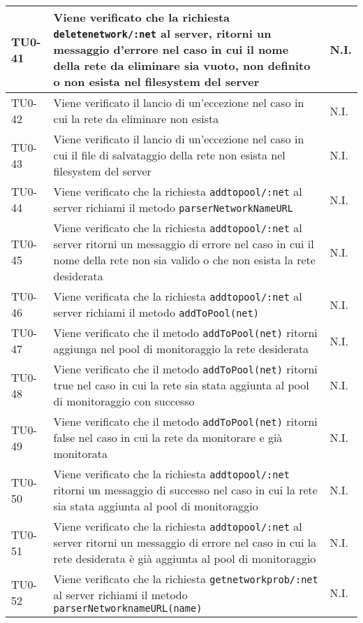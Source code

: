 \begin{longtable}{|C{.15\textwidth}|m{.66\textwidth}|C{.10\textwidth}|}
 \hline
 TU0-41 & Viene verificato che la richiesta \texttt{deletenetwork/:net} al server, ritorni un messaggio d'errore nel caso in cui il nome della rete da eliminare sia vuoto,  non definito o non esista nel filesystem del server & N.I. \\ 
 \hline
{}TU0-42 & Viene verificato il lancio di un'eccezione nel caso in cui la rete da eliminare non esista & N.I. \\ 
\hline
 TU0-43 & Viene verificato il lancio di un'eccezione nel caso in cui il file di salvataggio della rete non esista nel filesystem del server & N.I. \\ 
 \hline
  TU0-44 & Viene verificato che la richiesta \texttt{addtopool/:net} al server richiami il metodo \texttt{parserNetworkNameURL} & N.I. \\ 
 \hline
 TU0-45 & Viene verificato che la richiesta \texttt{addtopool/:net} al server ritorni un messaggio di errore nel caso in cui il nome della rete non sia valido o che non esista la rete desiderata & N.I. \\ 
 \hline
 TU0-46 & Viene verificata che la richiesta \texttt{addtopool/:net} al server richiami il metodo \texttt{addToPool(net)} & N.I. \\ 
 \hline
 TU0-47 & Viene verificato che il metodo \texttt{addToPool(net)} ritorni aggiunga nel pool di monitoraggio la rete desiderata & N.I. \\
\hline
{} TU0-48 & Viene verificato che il metodo \texttt{addToPool(net)} ritorni true nel caso in cui la rete sia stata aggiunta al pool di monitoraggio con successo & N.I. \\ 
\hline 
TU0-49 & Viene verificato che il metodo \texttt{addToPool(net)} ritorni false nel caso in cui la rete da monitorare e già monitorata & N.I. \\ 
\hline
{} TU0-50 & Viene verificato che la richiesta \texttt{addtopool/:net} ritorni un messaggio di successo nel caso in cui la rete sia stata aggiunta al pool di monitoraggio & N.I. \\ 
\hline 
TU0-51 & Viene verificato che la richiesta \texttt{addtopool/:net} al server ritorni un messaggio di errore nel caso in cui la rete desiderata è già aggiunta al pool di monitoraggio & N.I. \\ 
\hline 
{} TU0-52 & Viene verificato che la richiesta \texttt{getnetworkprob/:net} al server richiami il metodo \texttt{parserNetworknameURL(name)} &  N.I. \\ 

\end{longtable}
